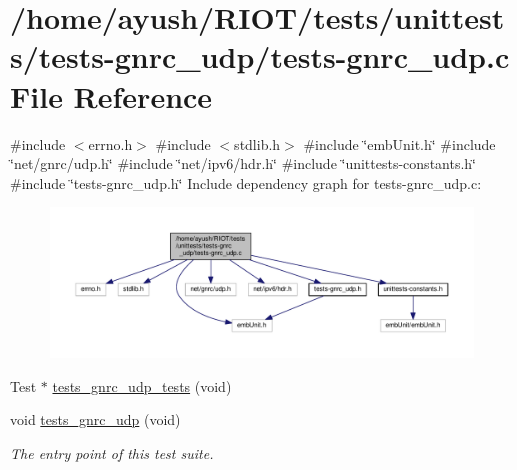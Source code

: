 \hypertarget{tests-gnrc__udp_8c}{}\section{/home/ayush/\+R\+I\+O\+T/tests/unittests/tests-\/gnrc\+\_\+udp/tests-\/gnrc\+\_\+udp.c File Reference}
\label{tests-gnrc__udp_8c}
{\ttfamily \#include $<$errno.\+h$>$}\newline
{\ttfamily \#include $<$stdlib.\+h$>$}\newline
{\ttfamily \#include \char`\"{}emb\+Unit.\+h\char`\"{}}\newline
{\ttfamily \#include \char`\"{}net/gnrc/udp.\+h\char`\"{}}\newline
{\ttfamily \#include \char`\"{}net/ipv6/hdr.\+h\char`\"{}}\newline
{\ttfamily \#include \char`\"{}unittests-\/constants.\+h\char`\"{}}\newline
{\ttfamily \#include \char`\"{}tests-\/gnrc\+\_\+udp.\+h\char`\"{}}\newline
Include dependency graph for tests-\/gnrc\+\_\+udp.c\+:
\nopagebreak
\begin{figure}[H]
\begin{center}
\leavevmode
\includegraphics[width=350pt]{tests-gnrc__udp_8c__incl}
\end{center}
\end{figure}
\begin{DoxyCompactItemize}
\item 
Test $\ast$ \hyperlink{tests-gnrc__udp_8c_af3e8df2cfd9dd04deca5dff44c4a6783}{tests\+\_\+gnrc\+\_\+udp\+\_\+tests} (void)
\item 
void \hyperlink{group__unittests_ga38d5edd024a05f621dcf3a505249ab59}{tests\+\_\+gnrc\+\_\+udp} (void)
\begin{DoxyCompactList}\small\item\em The entry point of this test suite. \end{DoxyCompactList}\end{DoxyCompactItemize}


